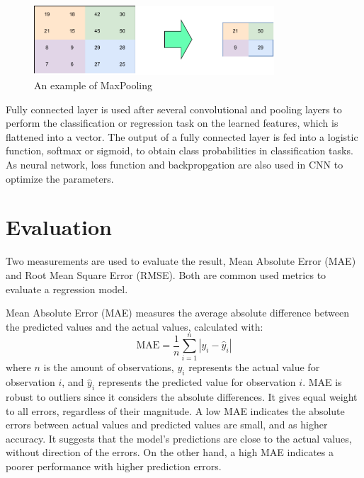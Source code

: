 \documentclass[12pt,a4paper,english
]{tunithesis}
\begin{document}
\begin{figure}
  \begin{center}
    \includegraphics[width=0.8\textwidth]{thesis/img/maxpooling.pdf}
  \end{center}
  \caption[MaxPooling]{An example of MaxPooling}
  \label{fig:maxpooling}
\end{figure}

Fully connected layer is used after several convolutional and pooling layers to perform the classification or regression task on the learned features, which is flattened into a vector. The output of a fully connected layer is fed into a logistic function, softmax or sigmoid, to obtain class probabilities in classification tasks. As neural network, loss function and backpropgation are also used in CNN to optimize the parameters.


\section{Evaluation}
Two measurements are used to evaluate the result, Mean Absolute Error (MAE) and Root Mean Square Error (RMSE). Both are common used metrics to evaluate a regression model.

Mean Absolute Error (MAE) measures the average absolute difference between the predicted values and the actual values, calculated with: 
\begin{equation}
    \mathrm{MAE}=\frac{1}{n} \sum_{i=1}^n\left|y_i-\hat{y}_i\right|
\end{equation}
where $n$ is the amount of observations, $y_i$ represents the actual value for observation $i$, and $\hat{y}_i$ represents the predicted value for observation $i$. MAE is robust to outliers since it considers the absolute differences. It gives equal weight to all errors, regardless of their magnitude. A low MAE indicates the absolute errors between actual values and predicted values are small, and as higher accuracy. It suggests that the model's predictions are close to the actual values, without direction of the errors. On the other hand, a high MAE indicates a poorer performance with higher prediction errors.
\end{document}
